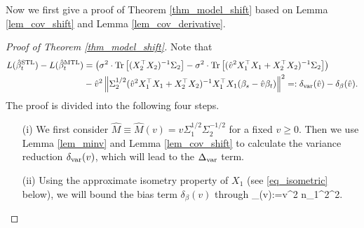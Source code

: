 Now we first give a proof of Theorem \ref{thm_model_shift} based on Lemma \ref{lem_cov_shift} and Lemma \ref{lem_cov_derivative}. 

\begin{proof}[Proof of Theorem \ref{thm_model_shift}]
Note that 
\begin{align*}
L(\hat{\beta}_t^{\text{STL}}) - L(\hat{\beta}_t^{\text{MTL}}) &=\left( \sigma^2 \cdot \operatorname{Tr}\left[(X_2^{\top}X_2)^{-1}\Sigma_2\right] - \sigma^2 \cdot \operatorname{Tr}\left[( \hat{v}^2 X_1^{\top}X_1 + X_2^{\top}X_2)^{-1} \Sigma_2\right]\right) \\
&- \hat{v}^2 \left\| \Sigma_2^{1/2}(\hat{v}^2 X_1^{\top}X_1 + X_2^{\top}X_2)^{-1} X_1^{\top}X_1 (\beta_s - \hat{v} \beta_t) \right\|^2=:\delta_{\text{var}}(\hat v) - \delta_{\beta}(\hat v).
\end{align*}
The proof is divided into the following four steps. 
\begin{itemize}
\item[(i)] We first consider $\hat M \equiv \hat M(v)= v\Sigma_1^{1/2}\Sigma_2^{-1/2}$ for a fixed $v\ge 0$. Then we use Lemma \ref{lem_minv} and Lemma \ref{lem_cov_shift} to calculate the variance reduction $\delta_{\text{var}}(v)$, which will lead to the $\Delta_{\text{var}}$ term.

\item[(ii)] Using the approximate isometry property of $X_1$ (see \eqref{eq_isometric} below), we will bound the bias term $ \delta_{\beta}(v)$
through 
\be\label{deltabetapf}
\wt\delta_{\beta}(v):={v}^2 n_1^2^2.\ee


\end{itemize}
\end{proof}
